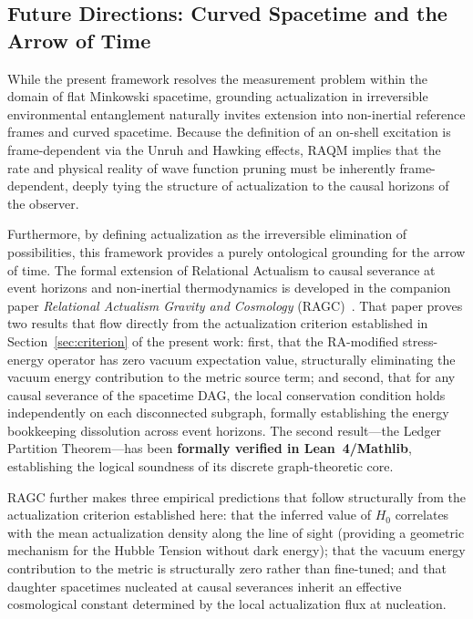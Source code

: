 \documentclass[11pt,a4paper]{article}
\theoremstyle{plain}
\theoremstyle{definition}
\theoremstyle{remark}
\begin{document}
\subsection{Future Directions: Curved Spacetime and the Arrow of Time}
\label{sec:future}

While the present framework resolves the measurement problem within the domain of
flat Minkowski spacetime, grounding actualization in irreversible environmental
entanglement naturally invites extension into non-inertial reference frames and
curved spacetime. Because the definition of an on-shell excitation is
frame-dependent via the Unruh and Hawking effects, RAQM implies that the rate and
physical reality of wave function pruning must be inherently frame-dependent,
deeply tying the structure of actualization to the causal horizons of the observer.

Furthermore, by defining actualization as the irreversible elimination of
possibilities, this framework provides a purely ontological grounding for the arrow
of time. The formal extension of Relational Actualism to causal severance at event
horizons and non-inertial thermodynamics is developed in the companion paper
\emph{Relational Actualism Gravity and Cosmology} (RAGC)~\citep{Sandeman2026RAGC}.
That paper proves two results that flow directly from the actualization criterion
established in Section~\ref{sec:criterion} of the present work: first, that the
RA-modified stress-energy operator has zero vacuum expectation value, structurally
eliminating the vacuum energy contribution to the metric source term; and second,
that for any causal severance of the spacetime DAG, the local conservation
condition holds independently on each disconnected subgraph, formally establishing
the energy bookkeeping dissolution across event horizons. The second result---the
Ledger Partition Theorem---has been \textbf{formally verified in Lean~4/Mathlib},
establishing the logical soundness of its discrete graph-theoretic core.

RAGC further makes three empirical predictions that follow structurally from the
actualization criterion established here: that the inferred value of $H_0$
correlates with the mean actualization density along the line of sight (providing
a geometric mechanism for the Hubble Tension without dark energy); that the vacuum
energy contribution to the metric is structurally zero rather than fine-tuned; and
that daughter spacetimes nucleated at causal severances inherit an effective
cosmological constant determined by the local actualization flux at nucleation.
\end{document}
